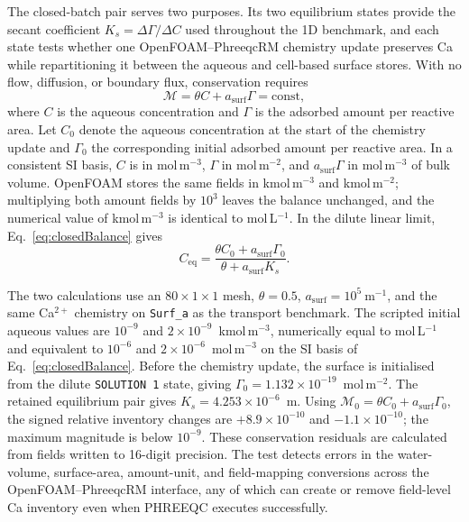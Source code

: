 The closed-batch pair serves two purposes. Its two equilibrium states provide
the secant coefficient $K_s=\Delta\Gamma/\Delta C$ used throughout the 1D
benchmark, and each state tests whether one OpenFOAM--PhreeqcRM chemistry update
preserves Ca while repartitioning it between the aqueous and cell-based surface
stores. With no flow, diffusion, or boundary flux, conservation requires
\begin{equation}
    \mathcal{M} = \theta C + a_{\mathrm{surf}}\Gamma = \mathrm{const},
    \label{eq:closedBalance}
\end{equation}
where $C$ is the aqueous concentration and $\Gamma$ is the adsorbed amount per
reactive area.
Let $C_0$ denote the aqueous concentration at the start of the chemistry update
and $\Gamma_0$ the corresponding initial adsorbed amount per reactive area. In a
consistent SI basis, $C$ is in mol\,m$^{-3}$, $\Gamma$ in mol\,m$^{-2}$, and
$a_{\mathrm{surf}}\Gamma$ in mol\,m$^{-3}$ of bulk volume. OpenFOAM stores the
same fields in kmol\,m$^{-3}$ and kmol\,m$^{-2}$; multiplying both amount fields
by $10^3$ leaves the balance unchanged, and the numerical value of kmol\,m$^{-3}$
is identical to mol\,L$^{-1}$. In the dilute linear limit,
Eq.~\eqref{eq:closedBalance} gives
\begin{equation}
    C_{\mathrm{eq}} =
    \frac{\theta C_0+a_{\mathrm{surf}}\Gamma_0}
         {\theta+a_{\mathrm{surf}}K_s}.
    \label{eq:batchEquil}
\end{equation}

The two calculations use an $80\times1\times1$ mesh, $\theta=0.5$,
$a_{\mathrm{surf}}=10^5\ \mathrm{m^{-1}}$, and the same Ca$^{2+}$ chemistry on
\texttt{Surf\_a} as the transport benchmark. The scripted initial aqueous
values are $10^{-9}$ and $2\times10^{-9}$~kmol\,m$^{-3}$, numerically equal to
mol\,L$^{-1}$ and equivalent to $10^{-6}$ and $2\times10^{-6}$~mol\,m$^{-3}$
on the SI basis of Eq.~\eqref{eq:closedBalance}. Before the chemistry update,
the surface is initialised from the dilute \texttt{SOLUTION 1} state, giving
$\Gamma_0=1.132\times10^{-19}$~mol\,m$^{-2}$. The retained equilibrium pair
gives $K_s=4.253\times10^{-6}$~m.
Using $\mathcal{M}_0=\theta C_0+a_{\mathrm{surf}}\Gamma_0$, the signed relative
inventory changes are $+8.9\times10^{-10}$ and $-1.1\times10^{-10}$; the maximum
magnitude is below $10^{-9}$. These conservation residuals are calculated from
fields written to 16-digit precision. The test detects errors in the
water-volume, surface-area, amount-unit, and field-mapping conversions across
the OpenFOAM--PhreeqcRM interface, any of which can create or remove field-level
Ca inventory even when PHREEQC executes successfully.

